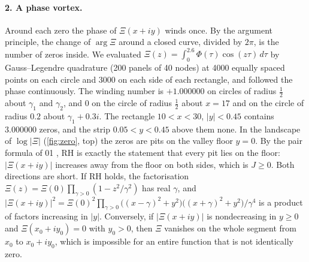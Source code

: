 \documentclass[11pt]{article}
\theoremstyle{definition}\newtheorem{definition}[theorem]{Definition}
\theoremstyle{remark}\newtheorem{remark}[theorem]{Remark}
\begin{document}
\paragraph{2. A phase vortex.} Around each zero the phase of $\Xi(x+iy)$ winds once. By the argument principle, the change of $\arg\Xi$ around a closed curve, divided by $2\pi$, is the number of zeros inside. We evaluated $\Xi(z)=\int_0^{2.6}\Phi(\tau)\cos(z\tau)\,d\tau$ by Gauss--Legendre quadrature (200 panels of 40 nodes) at 4000 equally spaced points on each circle and 3000 on each side of each rectangle, and followed the phase continuously. The winding number is $+1.000000$ on circles of radius $\frac12$ about $\gamma_1$ and $\gamma_2$, and $0$ on the circle of radius $\frac12$ about $x=17$ and on the circle of radius $0.2$ about $\gamma_1+0.3i$. The rectangle $10<x<30$, $|y|<0.45$ contains $3.000000$ zeros, and the strip $0.05<y<0.45$ above them none. In the landscape of $\log|\Xi|$ (\cref{fig:zero}, top) the zeros are pits on the valley floor $y=0$. By the pair formula of 01 \cite{SMath}, RH is exactly the statement that every pit lies on the floor: $|\Xi(x+iy)|$ increases away from the floor on both sides, which is $J\ge0$. Both directions are short. If RH holds, the factorisation $\Xi(z)=\Xi(0)\prod_{\gamma>0}(1-z^2/\gamma^2)$ \cite[\S2.12]{Titchmarsh} has real $\gamma$, and $|\Xi(x+iy)|^2=\Xi(0)^2\prod_{\gamma>0}\bigl((x-\gamma)^2+y^2\bigr)\bigl((x+\gamma)^2+y^2\bigr)/\gamma^4$ is a product of factors increasing in $|y|$. Conversely, if $|\Xi(x+iy)|$ is nondecreasing in $y\ge0$ and $\Xi(x_0+iy_0)=0$ with $y_0>0$, then $\Xi$ vanishes on the whole segment from $x_0$ to $x_0+iy_0$, which is impossible for an entire function that is not identically zero.
\end{document}
